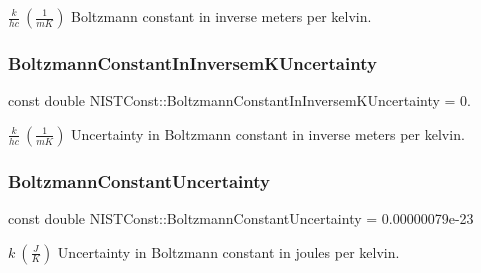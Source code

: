 $\frac{k}{h c} \ (\frac{1}{m K})$ Boltzmann constant in inverse meters per kelvin. \mbox{\label{group___boltzmann_constant_gadb520d4ce5d980c8ba24d9499f500873}} 
\subsubsection{\texorpdfstring{Boltzmann\+Constant\+In\+Inversem\+K\+Uncertainty}{BoltzmannConstantInInversemKUncertainty}}
{\footnotesize\ttfamily const double N\+I\+S\+T\+Const\+::\+Boltzmann\+Constant\+In\+Inversem\+K\+Uncertainty = 0.}

$\frac{k}{h c} \ (\frac{1}{m K})$ Uncertainty in Boltzmann constant in inverse meters per kelvin. \mbox{\label{group___boltzmann_constant_gaa32ac947c545e70076f0e08aceb3ce16}} 
\subsubsection{\texorpdfstring{Boltzmann\+Constant\+Uncertainty}{BoltzmannConstantUncertainty}}
{\footnotesize\ttfamily const double N\+I\+S\+T\+Const\+::\+Boltzmann\+Constant\+Uncertainty = 0.\+00000079e-\/23}

$k \ (\frac{J}{K})$ Uncertainty in Boltzmann constant in joules per kelvin. 